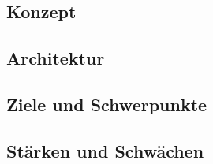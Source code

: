 





\subsection{Konzept}
\subsection{Architektur}
\subsection{Ziele und Schwerpunkte}
\subsection{Stärken und Schwächen}
